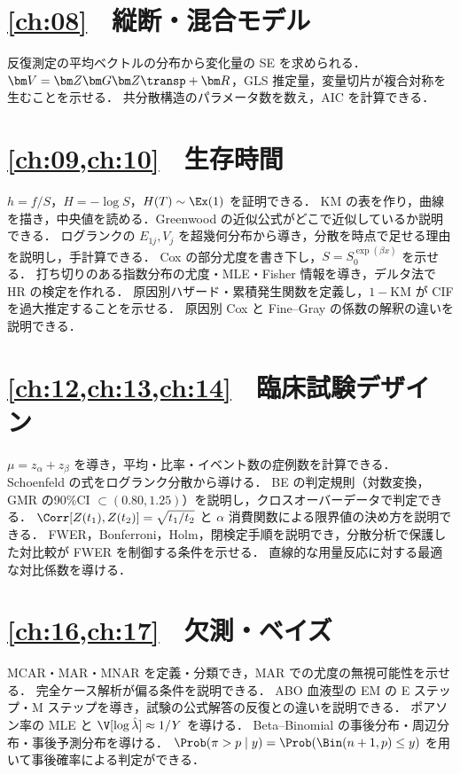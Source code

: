 \section*{\cref{ch:08}　縦断・混合モデル}
\begin{itemize}
\chk 反復測定の平均ベクトルの分布から変化量の SE を求められる．
\chk $\bm V=\bm Z\bm G\bm Z\transp+\bm R$，GLS 推定量，変量切片が複合対称を生むことを示せる．
\chk 共分散構造のパラメータ数を数え，AIC を計算できる．
\end{itemize}
\section*{\cref{ch:09,ch:10}　生存時間}
\begin{itemize}
\chk $h=f/S$，$H=-\log S$，$H(T)\sim\Ex(1)$ を証明できる．
\chk KM の表を作り，曲線を描き，中央値を読める．Greenwood の近似公式がどこで近似しているか説明できる．
\chk ログランクの $E_{1j},V_j$ を超幾何分布から導き，分散を時点で足せる理由を説明し，手計算できる．
\chk Cox の部分尤度を書き下し，$S=S_0^{\exp(\beta x)}$ を示せる．
\chk 打ち切りのある指数分布の尤度・MLE・Fisher 情報を導き，デルタ法で HR の検定を作れる．
\chk 原因別ハザード・累積発生関数を定義し，$1-$KM が CIF を過大推定することを示せる．
\chk 原因別 Cox と Fine--Gray の係数の解釈の違いを説明できる．
\end{itemize}
\section*{\cref{ch:12,ch:13,ch:14}　臨床試験デザイン}
\begin{itemize}
\chk $\mu=z_\alpha+z_\beta$ を導き，平均・比率・イベント数の症例数を計算できる．
\chk Schoenfeld の式をログランク分散から導ける．
\chk BE の判定規則（対数変換，GMR の90\%CI $\subset(0.80,1.25)$）を説明し，クロスオーバーデータで判定できる．
\chk $\Corr[Z(t_1),Z(t_2)]=\sqrt{t_1/t_2}$ と $\alpha$ 消費関数による限界値の決め方を説明できる．
\chk FWER，Bonferroni，Holm，閉検定手順を説明でき，分散分析で保護した対比較が FWER を制御する条件を示せる．
\chk 直線的な用量反応に対する最適な対比係数を導ける．
\end{itemize}
\section*{\cref{ch:16,ch:17}　欠測・ベイズ}
\begin{itemize}
\chk MCAR・MAR・MNAR を定義・分類でき，MAR での尤度の無視可能性を示せる．
\chk 完全ケース解析が偏る条件を説明できる．
\chk ABO 血液型の EM の E ステップ・M ステップを導き，試験の公式解答の反復との違いを説明できる．
\chk ポアソン率の MLE と $\V[\log\hat\lambda]\approx1/Y$ を導ける．
\chk Beta--Binomial の事後分布・周辺分布・事後予測分布を導ける．
\chk $\Prob(\pi>p\mid y)=\Prob(\Bin(n+1,p)\le y)$ を用いて事後確率による判定ができる．
\end{itemize}

